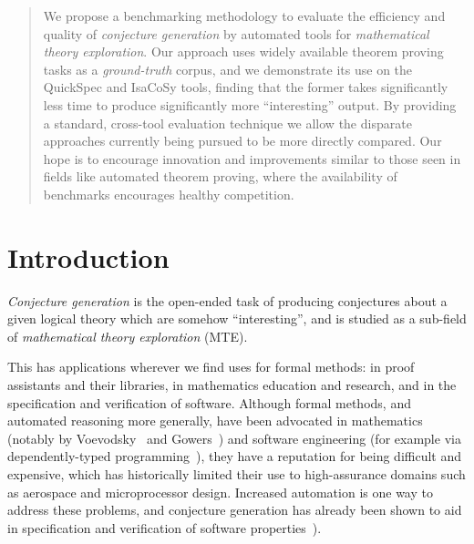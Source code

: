 \begin{abstract}
  We propose a benchmarking methodology to evaluate the efficiency and quality
  of \emph{conjecture generation} by automated tools for \emph{mathematical
    theory exploration}. Our approach uses widely available theorem proving
  tasks as a \emph{ground-truth} corpus, and we demonstrate its use on the
  QuickSpec and IsaCoSy tools, finding that the former takes significantly less
  time to produce significantly more ``interesting'' output. By providing a
  standard, cross-tool evaluation technique we allow the disparate approaches
  currently being pursued to be more directly compared. Our hope is to encourage
  innovation and improvements similar to those seen in fields like automated
  theorem proving, where the availability of benchmarks encourages healthy
  competition.
\end{abstract}

\section{Introduction}
\label{intro}


\emph{Conjecture generation} is the open-ended task of producing conjectures
about a given logical theory which are somehow ``interesting'', and is studied
as a sub-field of \emph{mathematical theory exploration} (MTE).

This has applications wherever we find uses for formal methods: in proof
assistants and their libraries, in mathematics education and research, and in
the specification and verification of software. Although formal methods, and
automated reasoning more generally, have been advocated in mathematics (notably
by Voevodsky~\cite{voevodsky2010univalent} and
Gowers~\cite{ganesalingam2013fully}) and software engineering (for example via
dependently-typed
programming~\cite{McKinna:2006, chlipala2011certified, Xi2003}), they have a
reputation for being difficult and expensive, which has historically limited
their use to high-assurance domains such as aerospace and microprocessor design.
Increased automation is one way to address these problems, and conjecture
generation has already been shown to aid in specification and verification of
software properties~\cite{Claessen.Johansson.Rosen.ea:2013}).

